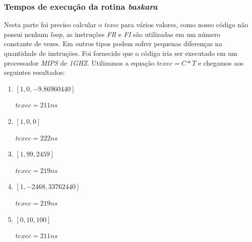\documentclass[12pt]{article}
\begin{document}
\subsubsection{Tempos de execução da rotina \textit{baskara}}
\label{subsubsec:4.4}

Nesta parte foi preciso calcular o \textit{texec} para vários valores, como nosso código não possui nenhum \textit{loop}, as instruções \textit{FR} e \textit{FI} são utilizadas em um número constante de vezes. Em outros tipos podem sofrer pequenas diferenças na quantidade de instruções. Foi fornecido que o código iria ser executado em um processador \textit{MIPS} de \textit{1GHZ}. Utilizamos a equação \(texec= C * T\) e chegamos aos seguintes resultados:

\begin{enumerate}
\item \([1, 0, -9.86960440]\)

	\(texec = 211 ns\)
\item \([1, 0, 0]\)

	\(texec = 222 ns\)
\item \([1, 99, 2459]\)

	\(texec = 219 ns\)

\item \([1, -2468, 33762440]\)

	\(texec = 219 ns\)
\item \([0, 10, 100]\)

	\(texec = 211 ns\)
\end{enumerate}



\end{document}
